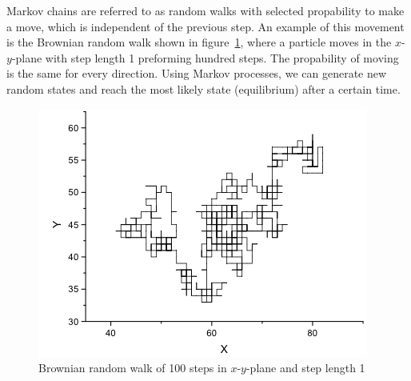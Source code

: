 Markov chains are referred to as random walks with selected propability to make a move, which is independent of the previous step. An example of this movement is the Brownian random walk shown in figure~\ref{fig:Brown}, where a particle moves in the $x$-$y$-plane with step length 1 preforming hundred steps. The propability of moving is the same for every direction. Using Markov processes, we can generate new random states and reach the most likely state (equilibrium) after a certain time.
\begin{figure}[htbp]
    \centering
    \includegraphics[scale=0.6]{Brown}
    \caption{Brownian random walk of 100 steps in $x$-$y$-plane and step length 1}
    \label{fig:Brown}
\end{figure}
\FloatBarrier
